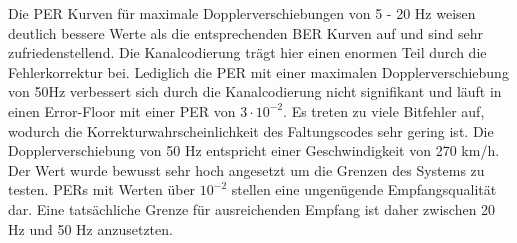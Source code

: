 Die PER Kurven für maximale Dopplerverschiebungen von 5 - 20 Hz weisen deutlich bessere Werte als die entsprechenden BER Kurven auf und sind sehr zufriedenstellend. Die Kanalcodierung trägt hier einen enormen Teil durch die Fehlerkorrektur bei. Lediglich die PER mit einer maximalen Dopplerverschiebung von 50Hz verbessert sich durch die Kanalcodierung nicht signifikant und läuft in einen Error-Floor mit einer PER von $3 \cdot 10^{-2}$. Es treten zu viele Bitfehler auf, wodurch die Korrekturwahrscheinlichkeit des Faltungscodes sehr gering ist. Die Dopplerverschiebung von 50 Hz entspricht einer Geschwindigkeit von 270 km/h. Der Wert wurde bewusst sehr hoch angesetzt um die Grenzen des Systems zu testen. PERs mit Werten über $10^{-2}$ stellen eine ungenügende Empfangsqualität dar. Eine tatsächliche Grenze für ausreichenden Empfang ist daher zwischen 20 Hz und 50 Hz anzusetzten.